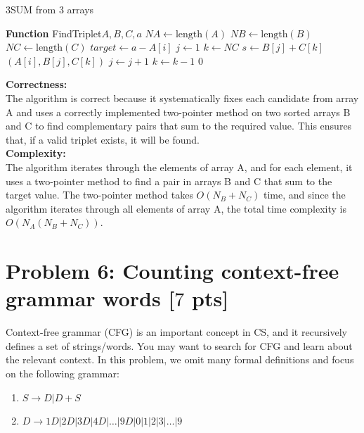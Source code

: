 \documentclass[letterpaper, 11pt]{article}
\newcommand{\1}{\mathds{1}}	%
\theoremstyle{definition}
\newcommand{\problem}[1]{\section*{Problem #1}}
\newenvironment{solution}{{\par\noindent\it Solution.}}{}
\begin{document}
\begin{solution}
    \begin{algorithm}[H]
        \caption{3SUM from 3 arrays}
        \begin{algorithmic}[1]
        \STATE \textbf{Function} {FindTriplet}{$A, B, C, a$}
            \STATE  $NA \gets \text{length}(A)$
            \STATE  $NB \gets \text{length}(B)$
            \STATE  $NC \gets \text{length}(C)$
                \STATE  $target \gets a - A[i]$
                \STATE $j \gets 1$
                \STATE  $k \gets NC$
                    \STATE $s \gets B[j] + C[k]$
                    \RETURN $(A[i], B[j], C[k])$
                        \STATE  $j \gets j + 1$
                    \ELSE
                        \STATE $k \gets k - 1$
                    \ENDIF
                \ENDWHILE
            \ENDFOR
            \RETURN $0$
        \end{algorithmic}
        \end{algorithm}
    \textbf{Correctness:}\\ 
    The algorithm is correct because it systematically fixes each candidate from array A and uses a correctly implemented two-pointer method on two sorted arrays B and C to find complementary pairs that sum to the required value. This ensures that, if a valid triplet exists, it will be found.     
\\\textbf{Complexity:}\\
The algorithm iterates through the elements of array A, and for each element, it uses a two-pointer method to find a pair in arrays B and C that sum to the target value. The two-pointer method takes $O(N_B + N_C)$ time, and since the algorithm iterates through all elements of array A, the total time complexity is $O(N_A(N_B + N_C))$.
\end{solution}    
\problem{6: Counting context-free grammar words [$7$ pts]}
Context-free grammar (CFG) is an important concept in CS, and it recursively defines a set of strings/words. You may want to search for CFG and learn about the relevant context. In this problem, we omit many formal definitions and focus on the following grammar:

\begin{enumerate}
    \item $S \rightarrow D | D + S$
    \item $D \rightarrow 1D | 2D | 3D | 4D | \ldots |9D |0|1|2|3|\ldots|9$
\end{enumerate}
\end{document}
